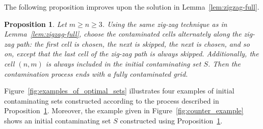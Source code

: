 \documentclass[letterpaper,12pt]{article}
\newtheorem{proposition}{Proposition}
\begin{document}
 



 






The following proposition improves upon the solution in Lemma~\ref{lem:zigzag-full}.


 
\begin{proposition}\label{prop:alternate-zigzag}
Let $m\ge n\ge 3$. Using the same zig-zag technique as in Lemma~\ref{lem:zigzag-full},
choose the contaminated cells alternately along the zig-zag path: the first cell is chosen,
the next is skipped, the next is chosen, and so on, except that the last cell of the zig-zag
path is always skipped. Additionally, the cell $(n,m)$ is always included in the initial
contaminating set $S$. Then the contamination process ends with a fully contaminated grid.
\end{proposition}

 




Figure~\ref{fig:examples_of_optimal_sets} illustrates four examples of initial contaminating sets constructed according to the process described in Proposition~\ref{prop:alternate-zigzag}. Moreover, the example given in Figure~\ref{fig:counter_example} shows an initial contaminating set $S$ constructed using Proposition~\ref{prop:alternate-zigzag}.
\end{document}
